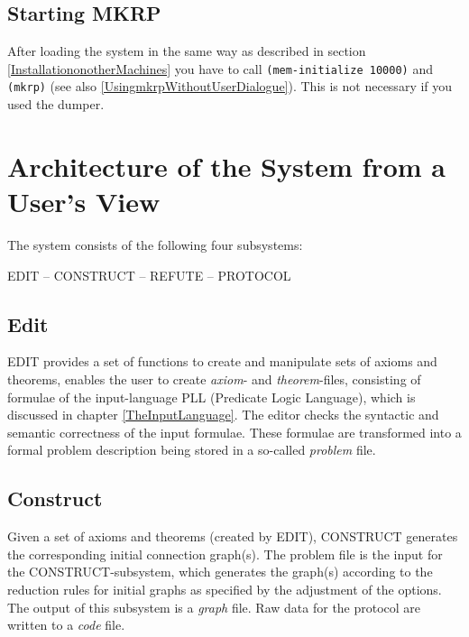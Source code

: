 \subsection{Starting MKRP}

After loading the system in the same way as described in
section \ref{InstallationonotherMachines} you have to call
{\tt (mem-initialize 10000)} and {\tt (mkrp)} (see also 
\ref{UsingmkrpWithoutUserDialogue}). This is not necessary if you used
the dumper.


\section{Architecture of the System from a User's View}
\label{ArchitectureoftheSystemfromaUser'sView}

The system consists of the following four subsystems: 

		EDIT
		-- CONSTRUCT
		-- REFUTE
		-- PROTOCOL

\subsection{Edit}

EDIT provides a set of functions to create and manipulate sets of 
axioms and theorems, enables the user to create 
{\em axiom\/}- and {\em theorem\/}-files, 
 
consisting of formulae of the input-language PLL (Predicate Logic
Language), which is discussed in chapter \ref{TheInputLanguage}. The
editor checks the syntactic and semantic correctness of the input
formulae. These formulae are transformed into a formal problem
description being stored in a so-called
{\em problem\/} file.

\subsection{Construct}

Given a set of axioms and theorems (created by EDIT), CONSTRUCT
generates the corresponding initial connection graph(s).  The problem
file is the input for the CONSTRUCT-subsystem, which generates the
graph(s) according to the reduction rules for initial graphs as
specified by the adjustment of the options. The output of this
subsystem is a {\em graph\/} file.
 Raw data for the 
protocol are written to a {\em code\/} file. \label{codefile} 

